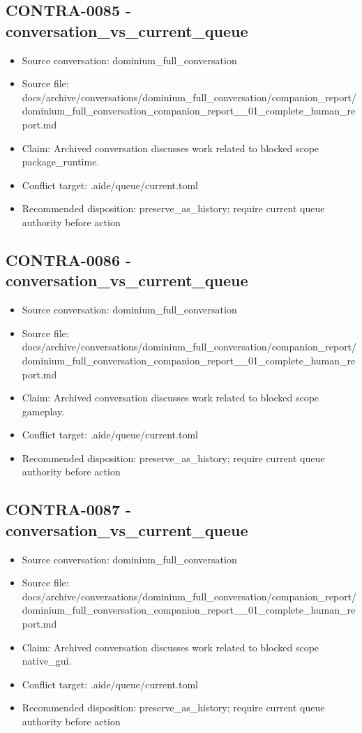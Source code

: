 \documentclass[11pt,a4paper]{report}
\begin{document}
\subsection{CONTRA-0085 - conversation\_vs\_current\_queue}

\begin{itemize}
\item Source conversation: dominium\_full\_conversation
\item Source file: docs/archive/conversations/dominium\_full\_conversation/companion\_report/dominium\_full\_conversation\_companion\_report\_\_01\_complete\_human\_report.md
\item Claim: Archived conversation discusses work related to blocked scope package\_runtime.
\item Conflict target: .aide/queue/current.toml
\item Recommended disposition: preserve\_as\_history; require current queue authority before action
\end{itemize}

\subsection{CONTRA-0086 - conversation\_vs\_current\_queue}

\begin{itemize}
\item Source conversation: dominium\_full\_conversation
\item Source file: docs/archive/conversations/dominium\_full\_conversation/companion\_report/dominium\_full\_conversation\_companion\_report\_\_01\_complete\_human\_report.md
\item Claim: Archived conversation discusses work related to blocked scope gameplay.
\item Conflict target: .aide/queue/current.toml
\item Recommended disposition: preserve\_as\_history; require current queue authority before action
\end{itemize}

\subsection{CONTRA-0087 - conversation\_vs\_current\_queue}

\begin{itemize}
\item Source conversation: dominium\_full\_conversation
\item Source file: docs/archive/conversations/dominium\_full\_conversation/companion\_report/dominium\_full\_conversation\_companion\_report\_\_01\_complete\_human\_report.md
\item Claim: Archived conversation discusses work related to blocked scope native\_gui.
\item Conflict target: .aide/queue/current.toml
\item Recommended disposition: preserve\_as\_history; require current queue authority before action
\end{itemize}
\end{document}
